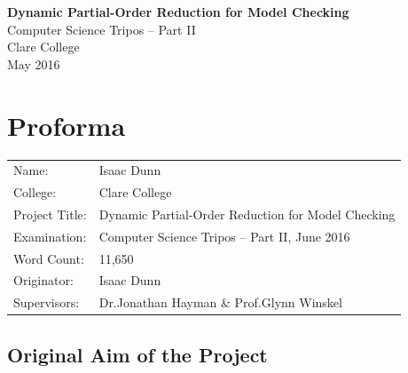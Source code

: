 \documentclass[12pt,a4paper,twoside,openany]{report}
\begin{document}




\thispagestyle{empty}


\vspace*{60mm}
\begin{center}
\Huge
\textbf{Dynamic Partial-Order Reduction for Model Checking} \\[7mm]
Computer Science Tripos -- Part II \\[6mm]
Clare College \\[7mm]
\LARGE May 2016  %
\end{center}


\pagestyle{plain}

\chapter*{Proforma}

{\large
\begin{tabular}{ll}
Name:           &  Isaac Dunn                            			 \\
College:        &  Clare College                    				     \\
Project Title:	&  Dynamic Partial-Order Reduction for Model Checking \\
Examination:    &  Computer Science Tripos -- Part II, June 2016      \\
Word Count:     &  11,650\footnotemark[1]					 \\
Originator: &  Isaac Dunn\footnotemark[2] 					 \\
Supervisors:	&  Dr.\@ Jonathan Hayman \& Prof.\@ Glynn Winskel         \\
\end{tabular}
}


\section*{Original Aim of the Project}
\end{document}

